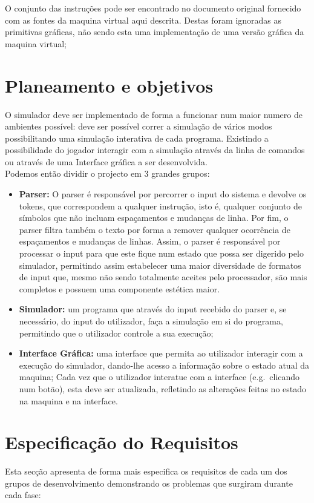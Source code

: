 \documentclass{report}
\begin{document}
\quad O conjunto das instruções pode ser encontrado no documento original fornecido com as fontes da maquina virtual aqui descrita.
Destas foram ignoradas as primitivas gráficas, não sendo esta uma implementação de uma versão gráfica da maquina virtual;

\section{Planeamento e objetivos}
\quad O simulador deve ser implementado de forma a funcionar num maior numero de ambientes possível:
deve ser possível correr a simulação de vários modos possibilitando uma simulação interativa de cada programa.
Existindo a possibilidade do jogador interagir com a simulação através da linha de comandos ou através de uma Interface
gráfica a ser desenvolvida.\\
\null\quad Podemos então dividir o projecto em 3 grandes grupos:
\begin{itemize}
	\item \textbf{Parser:} O parser é responsável por percorrer o input do sistema e devolve
	os tokens, que correspondem a qualquer instrução, isto é, qualquer conjunto de símbolos que não incluam
	espaçamentos e mudanças de linha.
	\quad Por fim, o parser filtra também o texto por forma a remover qualquer ocorrência de espaçamentos e mudanças de linhas.
	Assim, o parser é responsável por processar o input para que este fique num estado que possa ser digerido pelo simulador,
	permitindo assim estabelecer uma maior diversidade de formatos de input que, mesmo não sendo totalmente aceites
	pelo processador, são mais completos e possuem uma componente estética maior.


	\item \textbf{Simulador:} um programa que através do input recebido do parser e, se necessário, do input do utilizador,
	faça a simulação em si do programa, permitindo que o utilizador controle a sua execução;

	\item \textbf{Interface Gráfica:} uma interface que permita ao utilizador interagir com a execução do simulador,
  dando-lhe acesso a informação sobre o estado atual da maquina;
	Cada vez que o utilizador interatue com a interface (e.g.\ clicando num botão), esta deve ser atualizada,
	refletindo as alterações feitas no estado na maquina e na interface.
\end{itemize}

\section{Especificação do Requisitos}
\quad Esta secção apresenta de forma mais especifica os requisitos de cada um dos grupos de desenvolvimento demonstrando os problemas que
surgiram durante cada fase:
\end{document}
